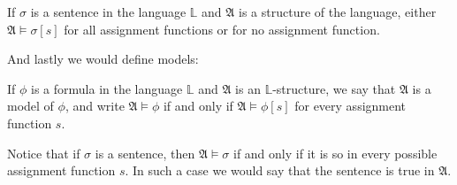\documentclass[9pt,a4paper, twocolumn]{article}
\newcommand{\curveL}{\mathbb{L} }
\newcommand{\curveA}{\mathfrak{A} }
\begin{document}
            \begin{corollary}
                If $\sigma$ is a sentence in the language $\curveL$ and $\curveA$ is a structure of the language, either $\curveA\vDash \sigma[s]$ for all assignment functions or for no assignment function.
            \end{corollary}
            And lastly we would define models:
            \begin{define}
                If $\phi$ is a formula in the language $\curveL$ and $\curveA$ is an $\curveL$-structure, we say that $\curveA$ is a model of $\phi$, and write $\curveA\vDash \phi$ if and only if $\curveA\vDash\phi[s]$ for every assignment function $s$. 
            \end{define}
            Notice that if $\sigma$ is a sentence, then $\curveA\vDash\sigma$ if and only if it is so in every possible assignment function $s$. In such a case we would say that the sentence is true in $\curveA$.
\end{document}
